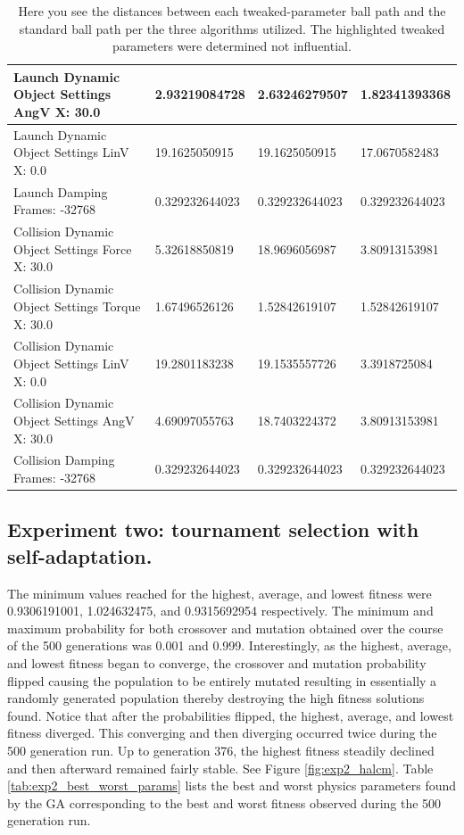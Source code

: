 \begin{table}[htbp]
\begin{tabular}{ | l || l | l | l | }
Launch Dynamic Object Settings AngV X: 30.0 & 2.93219084728  & 2.63246279507  & 1.82341393368 \\ \hline
Launch Dynamic Object Settings LinV X: 0.0 & 19.1625050915  & 19.1625050915  & 17.0670582483 \\ \hline
\rowcolor{cyan}
Launch Damping Frames: -32768 & 0.329232644023 & 0.329232644023  & 0.329232644023 \\ \hline
Collision Dynamic Object Settings Force X: 30.0 & 5.32618850819  & 18.9696056987  & 3.80913153981 \\ \hline
Collision Dynamic Object Settings Torque X: 30.0 & 1.67496526126  & 1.52842619107  & 1.52842619107 \\ \hline
Collision Dynamic Object Settings LinV X: 0.0 & 19.2801183238  & 19.1535557726  & 3.3918725084 \\ \hline
Collision Dynamic Object Settings AngV X: 30.0 & 4.69097055763 & 18.7403224372 & 3.80913153981 \\ \hline
\rowcolor{cyan}
Collision Damping Frames: -32768 & 0.329232644023 & 0.329232644023 & 0.329232644023 \\ \hline
\end{tabular}
\caption[Physics Engine Parameter Influences]{Here you see the distances between each tweaked-parameter ball path and the standard ball path per the three algorithms utilized. The highlighted tweaked parameters were determined not influential.}
\label{tab:distances}
\end{table}

\newpage

\subsection[Experiment Two]{Experiment two: tournament selection with self-adaptation.}

The minimum values reached for the highest, average, and lowest fitness were 0.9306191001, 1.024632475, and 0.9315692954 respectively. The minimum and maximum probability for both crossover and mutation obtained over the course of the 500 generations was 0.001 and 0.999. Interestingly, as the highest, average, and lowest fitness began to converge, the crossover and mutation probability flipped causing the population to be entirely mutated resulting in essentially a randomly generated population thereby destroying the high fitness solutions found. Notice that after the probabilities flipped, the highest, average, and lowest fitness diverged. This converging and then diverging occurred twice during the 500 generation run. Up to generation 376, the highest fitness steadily declined and then afterward remained fairly stable. See Figure \ref{fig:exp2_halcm}. Table \ref{tab:exp2_best_worst_params} lists the best and worst physics parameters found by the GA corresponding to the best and worst fitness observed during the 500 generation run.

